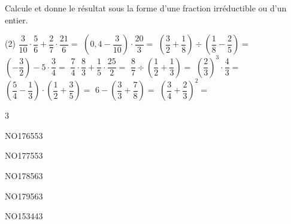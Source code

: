 \documentclass[a4paper,11pt]{report}
\begin{document}
\newpage
\begin{exo}{
Calcule et donne le résultat sous la forme d'une fraction irréductible ou d'un entier.
\begin{tasks}(2)
	\task $\dfrac{3}{10}\cdot \dfrac{5}{6} + \dfrac{2}{7}\cdot \dfrac{21}{6}=$
    \task $\left(0,4-\dfrac{3}{10}\right)\cdot\dfrac{20}{3}=$
	\task $\left(\dfrac{3}{2}+\dfrac{1}{8} \right)\div \left(\dfrac{1}{8}-\dfrac{2}{5}\right)=$
	\task $\left(-\dfrac{3}{2}\right)- 5\cdot\dfrac{3}{4}=$
    \task $\dfrac{7}{4}\cdot\dfrac{8}{3}+\dfrac{1}{5} \cdot \dfrac{25}{2}=$
	\task $\dfrac{8}{7}\div\left(\dfrac{1}{2}+\dfrac{1}{3} \right)=$
	\task $\left(\dfrac{2}{3} \right)^3 \cdot \dfrac{4}{3}=$
	\task $\left(\dfrac{5}{4}-\dfrac{1}{3}\right)\cdot\left(\dfrac{1}{2}+\dfrac{3}{5}\right)=$
    \task $6-\left(\dfrac{3}{3}+\dfrac{7}{8}\right)=$
    \task $\left(\dfrac{3}{4}+\dfrac{2}{3}\right)^2=$
\end{tasks}
}{3}
\end{exo}

\begin{exof}{NO176}{55}{3}
\end{exof}
\begin{exof}{NO177}{55}{3}
\end{exof}
\begin{exof}{NO178}{56}{3}
\end{exof}
\begin{exof}{NO179}{56}{3}
\end{exof}

\begin{exol}{NO153}{44}{3}
\end{exol}

\begin{FLP}{53}{3}
\end{FLP}
\end{document}
